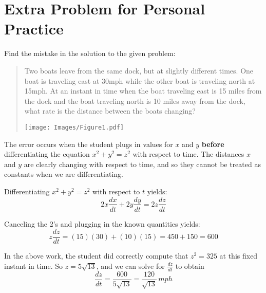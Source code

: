 \documentclass[handout,nooutcomes]{ximera}
\renewenvironment{freeResponse}{
\ifhandout\setbox0\vbox\bgroup\else
\begin{trivlist}\item[\hskip \labelsep\bfseries Solution:\hspace{2ex}]
\fi}
{\ifhandout\egroup\else
\end{trivlist}
\fi}
\newcommand{\dd}[2][]{\frac{d #1}{d #2}}
\newcommand{\dfn}{\textbf}
\begin{document}
\section{Extra Problem for Personal Practice}
\begin{problem}
  Find the mistake in the solution to the given problem:

  \begin{quote}
    Two boats leave from the same dock, but at slightly different
    times.  One boat is traveling east at 30mph while the other boat
    is traveling north at 15mph.  At an instant in time when the boat
    traveling east is 15 miles from the dock and the boat traveling
    north is 10 miles away from the dock, what rate is the distance
    between the boats changing?
    \begin{image}
      \texttt{[image: Images/Figure1.pdf]}
    \end{image}
  \end{quote}
		\begin{freeResponse}
		The error occurs when the student plugs in values for $x$ and $y$ \dfn{before} differentiating the equation $x^2 + y^2 = z^2$ with respect to time.  The distances $x$ and $y$ are clearly changing with respect to time, and so they cannot be treated as constants when we are differentiating.
		
		Differentiating $x^2 + y^2 = z^2$ with respect to $t$ yields:
		$$ 2x \dd[x]{t} + 2y \dd[y]{t} = 2z \dd[z]{t}$$
		
		Canceling the 2's and plugging in the known quantities yields:
		$$ z \dd[z]{t} = (15)(30) + (10)(15) = 450 + 150 = 600 $$
		
		In the above work, the student did correctly compute that $z^2 = 325$ at this fixed instant in time.  So $z = 5\sqrt{13}$, and we can solve for $\dd[z]{t}$ to obtain
		$$ \dd[z]{t} = \frac{600}{5 \sqrt{13}} = \frac{120}{\sqrt{13}} \, mph $$
		\end{freeResponse}	

\end{problem}
\end{document}
